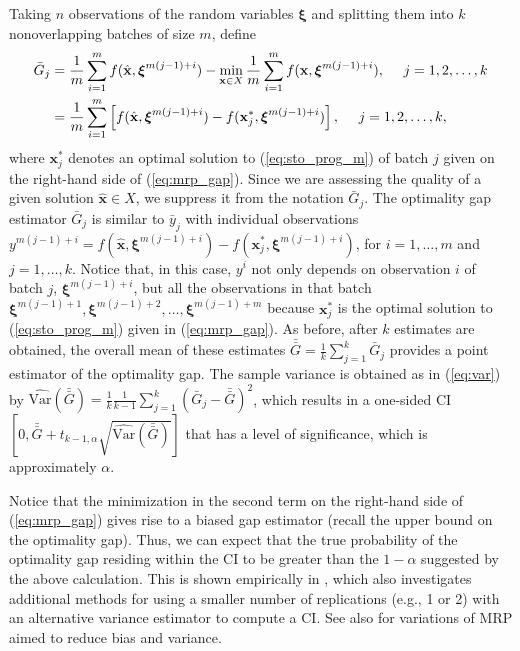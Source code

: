 \documentclass[12pt]{article}
\newcommand{\varh}[1]{\widehat{\mathrm{Var}} \left( #1 \right)}
\newcommand{\X}{X}
\newcommand{\x}{\mathbf{x}}
\newcommand{\xh}{{\hat{\x}}}
\newcommand{\xs}{\x^*}
\newcommand{\xit}{\boldsymbol{\xi}}
\newcommand{\gb}{\bar{G}}
\newcommand{\gbb}{\bar{\gb}}
\newcommand{\yb}{\bar{y}}
\begin{document}
Taking $n$ observations of the random variables $\xit$ and splitting them into $k$ nonoverlapping batches of size $m$, define 
\begin{align} 
	\gb_j  & = \frac{1}{m} \sum_{i = 1}^{m} f(\xh, \xit^{m(j-1)+i}) - \min_{\x \in X} \frac{1}{m} \sum_{i=1}^{m} f(\x, \xit^{m(j-1)+i}), \ \ \ \ j = 1,2, \dots, k \label{eq:mrp_gap}\\
         & = \frac{1}{m} \sum_{i = 1}^{m} \left[ f(\xh, \xit^{m(j-1)+i}) -  f(\xs_j, \xit^{m(j-1)+i}) \right], \ \ \ \ j = 1,2, \dots, k, \notag
\end{align}
where $\xs_j$ denotes an optimal solution to (\ref{eq:sto_prog_m}) of batch $j$ given on the right-hand side of (\ref{eq:mrp_gap}).    
Since we are assessing the quality of a given solution $\xh \in \X$, we suppress it from the notation $\gb_j$.
The optimality gap estimator $\gb_j$ is similar to $\yb_j$ with individual observations $y^{m(j-1)+i} = f(\xh,\xit^{m(j-1)+i}) - f(\xs_j,\xit^{m(j-1)+i})$, for $i=1,\ldots,m$ and $j=1,\ldots, k$.
Notice that, in this case, $y^i$ not only depends on observation $i$ of batch $j$, $\xit^{m(j-1)+i}$, but all the observations in that batch $\xit^{m(j-1)+1},\xit^{m(j-1)+2},\ldots,\xit^{m(j-1)+m}$ because $\xs_j$ is the optimal solution to (\ref{eq:sto_prog_m}) given in (\ref{eq:mrp_gap}).   
As before, after $k$ estimates are obtained, the overall mean of these estimates $\gbb = \frac{1}{k} \sum_{j=1}^k \gb_j$ provides a point estimator of the optimality gap.  
The sample variance is obtained as in (\ref{eq:var}) by $\varh{\gbb} = \frac{1}{k} \frac{1}{k-1} \sum_{j=1}^k (\gb_j - \gbb)^2$, which results in a one-sided CI $\left[0, \gbb + t_{k-1,\alpha} \sqrt{\varh{\gbb}} \right]$ that has a level of significance, which is approximately $\alpha$.

Notice that the minimization in the second term on the right-hand side of (\ref{eq:mrp_gap}) gives rise to a biased gap estimator (recall the upper bound on the optimality gap).  
Thus, we can expect that the true probability of the optimality gap residing within the CI to be greater than the $1 - \alpha$ suggested by the above calculation.  
This is shown empirically in \citep{Bayraksan2006}, which also investigates additional methods for using a smaller number of replications (e.g., 1 or 2) with an alternative variance estimator to compute a CI.  
See also \citep{bayraksan_morton_09,partani2006jackknife,partani_07} for variations of MRP aimed to reduce bias and variance.
\end{document}
